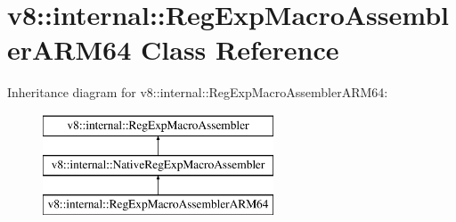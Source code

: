 \hypertarget{classv8_1_1internal_1_1_reg_exp_macro_assembler_a_r_m64}{}\section{v8\+:\+:internal\+:\+:Reg\+Exp\+Macro\+Assembler\+A\+R\+M64 Class Reference}
\label{classv8_1_1internal_1_1_reg_exp_macro_assembler_a_r_m64}
Inheritance diagram for v8\+:\+:internal\+:\+:Reg\+Exp\+Macro\+Assembler\+A\+R\+M64\+:\begin{figure}[H]
\begin{center}
\leavevmode
\includegraphics[height=3.000000cm]{classv8_1_1internal_1_1_reg_exp_macro_assembler_a_r_m64}
\end{center}
\end{figure}
